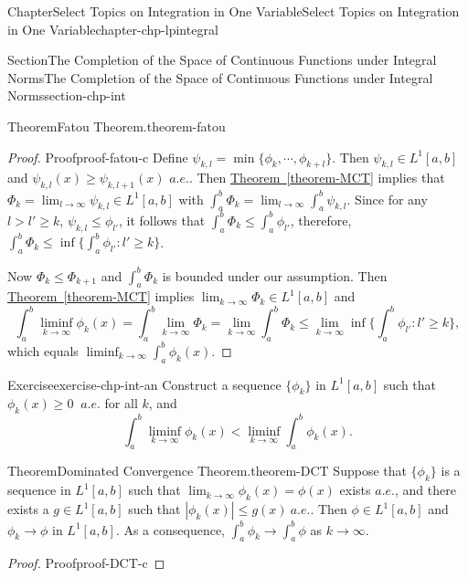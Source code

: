 \documentclass[oneside,10pt,]{book}
\newcommand{\xreffont}{\relax}
\numberwithin{equation}{section}
\begin{document}
\begin{chapterptx}{Chapter}{Select Topics on Integration in One Variable}{}{Select Topics on Integration in One Variable}{}{}{chapter-chp-lpintegral}
\begin{sectionptx}{Section}{The Completion of the Space of Continuous Functions under Integral Norms}{}{The Completion of the Space of Continuous Functions under Integral Norms}{}{}{section-chp-int}
\begin{theorem}{Theorem}{Fatou Theorem.}{}{theorem-fatou}
\begin{equation*}
\end{equation*}
\end{theorem}
\begin{proof}{Proof}{}{proof-fatou-c}
Define \(\psi_{k,l}=\min\{\phi_{k},\cdots, \phi_{k+l}\}\). Then \(\psi_{k,l}\in L^{1}[a, b]\) and \(\psi_{k,l}(x)\ge \psi_{k,l+1}(x)\) \(a.e.\). Then \hyperref[theorem-MCT]{Theorem~{\xreffont\ref{theorem-MCT}}} implies that \(\Phi_{k}=\lim_{l\to\infty} \psi_{k,l} \in L^{1}[a, b]\) with \(\int_{a}^{b} \Phi_{k} = \lim_{l\to\infty}\int_{a}^{b} \psi_{k,l}\). Since for any \(l > l' \ge k\), \(\psi_{k,l} \le \phi_{l'}\), it follows that \(\int_{a}^{b} \Phi_{k}  \le \int_{a}^{b} \phi_{l'}\), therefore, \(\int_{a}^{b} \Phi_{k}  \le  \inf\{ \int_{a}^{b} \phi_{l'}: l'\ge k\}\).%
\par
Now \(\Phi_{k} \le \Phi_{k+1} \) and \(\int_{a}^{b} \Phi_{k} \) is bounded under our assumption. Then \hyperref[theorem-MCT]{Theorem~{\xreffont\ref{theorem-MCT}}} implies \(\lim_{k\to\infty} \Phi_{k} \in L^{1}[a, b]\) and%
\begin{equation*}
\int_{a}^{b}  \liminf_{k\to \infty} \phi_{k}(x)
= \int_{a}^{b} \lim_{k\to\infty}  \Phi_{k} = \lim_{k\to\infty}  \int_{a}^{b}  \Phi_{k} 
\le \lim_{k\to\infty} \inf\{ \int_{a}^{b} \phi_{l'}: l'\ge k\},
\end{equation*}
which equals \(\liminf_{k\to \infty} \int_{a}^{b} \phi_{k}(x)\).%
\end{proof}
\begin{inlineexercise}{Exercise}{}{exercise-chp-int-an}%
Construct a sequence \(\{\phi_{k}\}\) in \(L^{1}[a, b]\) such that \(\phi_{k}(x)\ge 0\) \(\ a.e.\) for all \(k\), and%
\begin{equation*}
\int_{a}^{b} \liminf_{k\to \infty} \phi_{k}(x) < \liminf_{k\to \infty} \int_{a}^{b} \phi_{k}(x)\text{.}
\end{equation*}
%
\end{inlineexercise}%
\begin{theorem}{Theorem}{Dominated Convergence Theorem.}{}{theorem-DCT}%
Suppose that \(\{\phi_{k}\}\) is a sequence in \(L^{1}[a, b]\) such that \(\lim_{k\to\infty} \phi_{k}(x) =\phi (x)\) exists \(a.e.\), and there exists a \(g\in L^{1}[a, b]\) such that \(|\phi_{k}(x)|\le g(x)\)\(\ a.e.\). Then \(\phi \in L^{1}[a, b]\) and \(\phi_{k}\to \phi\) in \(L^{1}[a, b]\). As a consequence, \(\int_{a}^{b} \phi_{k} \to \int_{a}^{b} \phi\) as \(k\to \infty\).\end{theorem}
\begin{proof}{Proof}{}{proof-DCT-c}

\end{proof}
\end{sectionptx}
\end{chapterptx}
\end{document}
